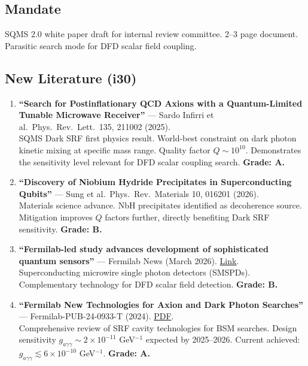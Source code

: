 \documentclass[11pt,a4paper]{article}
\begin{document}
\subsection{Mandate}
SQMS 2.0 white paper draft for internal review committee. 2--3 page document. Parasitic search mode for DFD scalar field coupling.

\subsection{New Literature (i30)}

\begin{enumerate}
\item \textbf{``Search for Postinflationary QCD Axions with a Quantum-Limited Tunable Microwave Receiver''} --- Sardo Infirri et al.\ Phys.\ Rev.\ Lett.\ 135, 211002 (2025).\\
SQMS Dark SRF first physics result. World-best constraint on dark photon kinetic mixing at specific mass range. Quality factor $Q \sim 10^{10}$. Demonstrates the sensitivity level relevant for DFD scalar coupling search. \textbf{Grade: A.}

\item \textbf{``Discovery of Niobium Hydride Precipitates in Superconducting Qubits''} --- Sung et al.\ Phys.\ Rev.\ Materials 10, 016201 (2026).\\
Materials science advance. NbH precipitates identified as decoherence source. Mitigation improves $Q$ factors further, directly benefiting Dark SRF sensitivity. \textbf{Grade: B.}

\item \textbf{``Fermilab-led study advances development of sophisticated quantum sensors''} --- Fermilab News (March 2026). \href{https://news.fnal.gov/2026/03/fermilab-led-study-advances-development-of-sophisticated-quantum-sensors-to-track-high-energy-particles-and-detect-dark-matter/}{Link}.\\
Superconducting microwire single photon detectors (SMSPDs). Complementary technology for DFD scalar field detection. \textbf{Grade: B.}

\item \textbf{``Fermilab New Technologies for Axion and Dark Photon Searches''} --- Fermilab-PUB-24-0933-T (2024). \href{https://lss.fnal.gov/archive/2024/pub/fermilab-pub-24-0933-t.pdf}{PDF}.\\
Comprehensive review of SRF cavity technologies for BSM searches. Design sensitivity $g_{a\gamma\gamma} \sim 2 \times 10^{-11}$ GeV$^{-1}$ expected by 2025--2026. Current achieved: $g_{a\gamma\gamma} \lesssim 6 \times 10^{-10}$ GeV$^{-1}$. \textbf{Grade: A.}
\end{enumerate}
\end{document}
